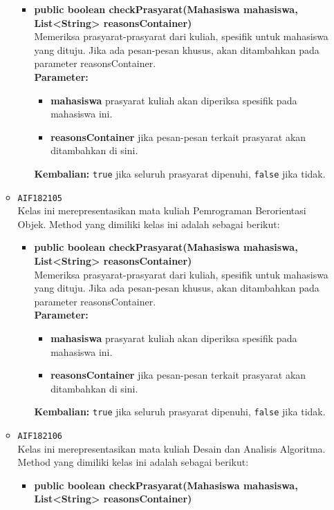 \begin{enumerate}
\begin{itemize}
\begin{itemize}
\item \textbf{public boolean checkPrasyarat(Mahasiswa mahasiswa, List<String> reasonsContainer)}\\
Memeriksa prasyarat-prasyarat dari kuliah, spesifik untuk mahasiswa yang dituju. Jika ada pesan-pesan khusus, akan ditambahkan pada parameter reasonsContainer.\\
\textbf{Parameter:}
\begin{itemize}
\item \textbf{mahasiswa} prasyarat kuliah akan diperiksa spesifik pada mahasiswa ini.
\item \textbf{reasonsContainer} jika pesan-pesan terkait prasyarat akan ditambahkan di sini.
\end{itemize}
\textbf{Kembalian:} \texttt{true} jika seluruh prasyarat dipenuhi, \texttt{false} jika tidak.
\end{itemize}
\item \texttt{AIF182105} \\
Kelas ini merepresentasikan mata kuliah Pemrograman Berorientasi Objek. Method yang dimiliki kelas ini adalah sebagai berikut: 
\begin{itemize}
\item \textbf{public boolean checkPrasyarat(Mahasiswa mahasiswa, List<String> reasonsContainer)}\\
Memeriksa prasyarat-prasyarat dari kuliah, spesifik untuk mahasiswa yang dituju. Jika ada pesan-pesan khusus, akan ditambahkan pada parameter reasonsContainer.\\
\textbf{Parameter:}
\begin{itemize}
\item \textbf{mahasiswa} prasyarat kuliah akan diperiksa spesifik pada mahasiswa ini.
\item \textbf{reasonsContainer} jika pesan-pesan terkait prasyarat akan ditambahkan di sini.
\end{itemize}
\textbf{Kembalian:} \texttt{true} jika seluruh prasyarat dipenuhi, \texttt{false} jika tidak.
\end{itemize}
\item \texttt{AIF182106} \\
Kelas ini merepresentasikan mata kuliah Desain dan Analisis Algoritma. Method yang dimiliki kelas ini adalah sebagai berikut: 
\begin{itemize}
\item \textbf{public boolean checkPrasyarat(Mahasiswa mahasiswa, List<String> reasonsContainer)}\\

\end{itemize}
\end{itemize}
\end{enumerate}
